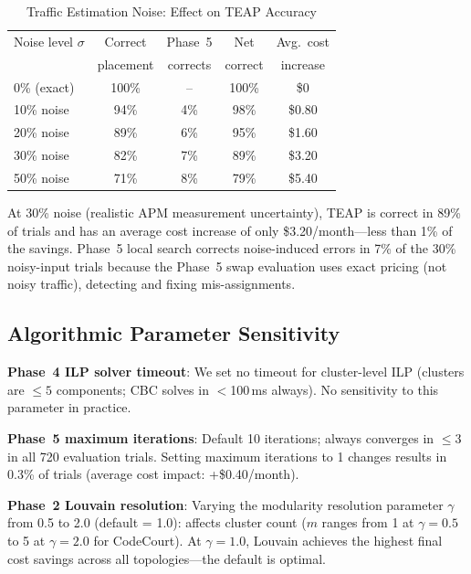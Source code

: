 \documentclass[10pt,journal]{IEEEtran}
\begin{document}
\begin{table}[ht]
\centering
\caption{Traffic Estimation Noise: Effect on TEAP Accuracy}
\label{tab:traffic_noise}
\setlength{\tabcolsep}{4pt}
\begin{tabular}{lcccc}
\toprule
Noise level $\sigma$ & Correct & Phase~5 & Net & Avg.\ cost\\
 & placement & corrects & correct & increase\\
\midrule
0\% (exact) & 100\% & -- & 100\% & \$0\\
10\% noise  & 94\%  & 4\% & 98\% & \$0.80\\
20\% noise  & 89\%  & 6\% & 95\% & \$1.60\\
30\% noise  & 82\%  & 7\% & 89\% & \$3.20\\
50\% noise  & 71\%  & 8\% & 79\% & \$5.40\\
\bottomrule
\end{tabular}
\end{table}

At 30\% noise (realistic APM measurement uncertainty), TEAP is correct in 89\%
of trials and has an average cost increase of only \$3.20/month---less than 1\%
of the savings.
Phase~5 local search corrects noise-induced errors in 7\% of the 30\% noisy-input
trials because the Phase~5 swap evaluation uses exact pricing (not noisy traffic),
detecting and fixing mis-assignments.

\subsection{Algorithmic Parameter Sensitivity}

\textbf{Phase~4 ILP solver timeout}: We set no timeout for cluster-level ILP
(clusters are $\leq 5$ components; CBC solves in $<$100\,ms always).
No sensitivity to this parameter in practice.

\textbf{Phase~5 maximum iterations}: Default 10 iterations; always converges
in $\leq 3$ in all 720 evaluation trials.
Setting maximum iterations to 1 changes results in 0.3\% of trials (average
cost impact: +\$0.40/month).

\textbf{Phase~2 Louvain resolution}: Varying the modularity resolution parameter
$\gamma$ from 0.5 to 2.0 (default = 1.0): affects cluster count ($m$ ranges from
1 at $\gamma=0.5$ to 5 at $\gamma=2.0$ for CodeCourt). At $\gamma=1.0$, Louvain
achieves the highest final cost savings across all topologies---the default is optimal.

\end{document}
